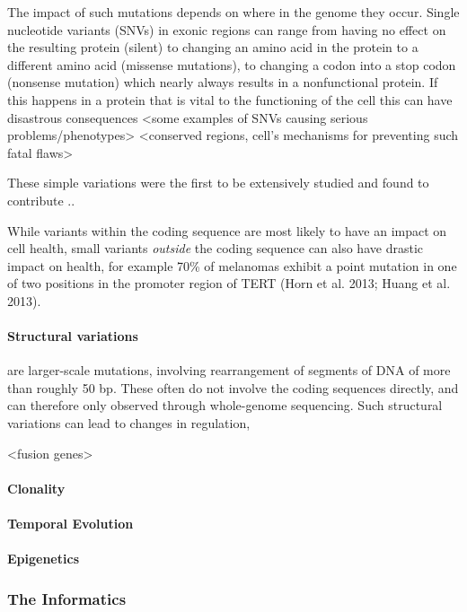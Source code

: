 The impact of such mutations depends on where in the genome they occur. Single nucleotide variants (SNVs) in exonic regions can range from having no effect on the resulting protein (silent) to changing an amino acid in the protein to a different amino acid (missense mutations), to changing a codon into a stop codon (nonsense mutation) which nearly always results in a nonfunctional protein. If this happens in a protein that is vital to the functioning of the cell this can have disastrous consequences <some examples of SNVs causing serious problems/phenotypes> <conserved regions, cell's mechanisms for preventing such fatal flaws>

These simple variations were the first to be extensively studied and found to contribute ..

While variants within the coding sequence are most likely to have an impact on cell health, small variants \emph{outside} the coding sequence can also have drastic impact on health, for example 70\% of melanomas exhibit a point mutation in one of two positions in the promoter region of TERT (Horn et al. 2013; Huang et al. 2013).

\paragraph{Structural variations} are larger-scale mutations, involving rearrangement of segments of DNA of more than roughly 50 bp. These often do not involve the coding sequences directly, and can therefore only observed through whole-genome sequencing. Such structural variations can lead to changes in regulation,

<fusion genes>


\paragraph{Clonality}


\paragraph{Temporal Evolution}
\paragraph{Epigenetics}

\subsubsection{The Informatics}

